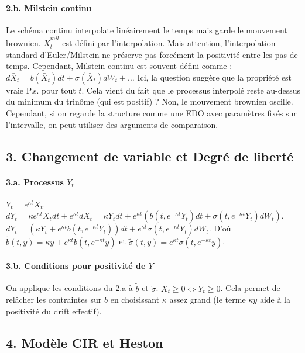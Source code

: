 \documentclass[a4paper,11pt]{article}
\begin{document}
\paragraph{2.b. Milstein continu}
Le schéma continu interpolate linéairement le temps mais garde le mouvement brownien.
$\bar{X}_t^{mil}$ est défini par l'interpolation. Mais attention, l'interpolation standard d'Euler/Milstein ne préserve pas forcément la positivité entre les pas de temps. Cependant, Milstein continu est souvent défini comme :
$d\bar{X}_t = b(\bar{X}_{\underline{t}})dt + \sigma(\bar{X}_{\underline{t}})dW_t + \dots$
Ici, la question suggère que la propriété est vraie P.s. pour tout $t$.
Cela vient du fait que le processus interpolé reste au-dessus du minimum du trinôme (qui est positif) ? Non, le mouvement brownien oscille.
Cependant, si on regarde la structure comme une EDO avec paramètres fixés sur l'intervalle, on peut utiliser des arguments de comparaison.

\subsection{3. Changement de variable et Degré de liberté}

\paragraph{3.a. Processus $Y_t$}
$Y_t = e^{\kappa t} X_t$.
$dY_t = \kappa e^{\kappa t} X_t dt + e^{\kappa t} dX_t = \kappa Y_t dt + e^{\kappa t} (b(t, e^{-\kappa t}Y_t) dt + \sigma(t, e^{-\kappa t}Y_t) dW_t)$.
$dY_t = (\kappa Y_t + e^{\kappa t} b(t, e^{-\kappa t}Y_t)) dt + e^{\kappa t} \sigma(t, e^{-\kappa t}Y_t) dW_t$.
D'où $\tilde{b}(t,y) = \kappa y + e^{\kappa t} b(t, e^{-\kappa t}y)$ et $\tilde{\sigma}(t,y) = e^{\kappa t} \sigma(t, e^{-\kappa t}y)$.

\paragraph{3.b. Conditions pour positivité de $Y$}
On applique les conditions du 2.a à $\tilde{b}$ et $\tilde{\sigma}$.
$X_t \ge 0 \iff Y_t \ge 0$.
Cela permet de relâcher les contraintes sur $b$ en choisissant $\kappa$ assez grand (le terme $\kappa y$ aide à la positivité du drift effectif).

\subsection{4. Modèle CIR et Heston}
\end{document}
